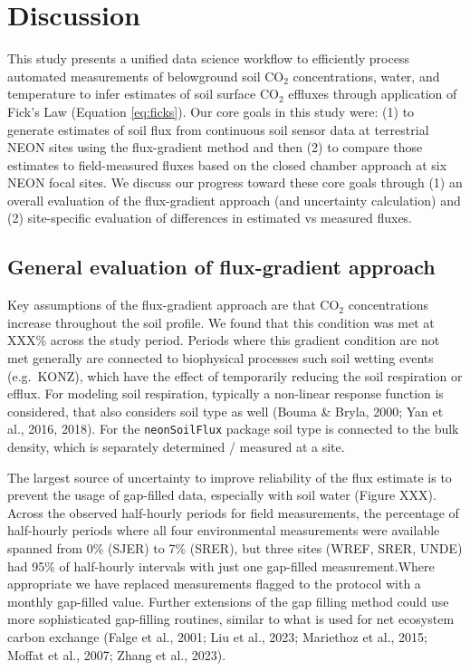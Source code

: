 \documentclass[
  letterpaper,
  DIV=11,
  numbers=noendperiod]{scrartcl}
\begin{document}
\section{Discussion}\label{sec-discussion}

This study presents a unified data science workflow to efficiently
process automated measurements of belowground soil CO\(_{2}\)
concentrations, water, and temperature to infer estimates of soil
surface CO\(_{2}\) effluxes through application of Fick's Law (Equation
\ref{eq:ficks}). Our core goals in this study were: (1) to generate
estimates of soil flux from continuous soil sensor data at terrestrial
NEON sites using the flux-gradient method and then (2) to compare those
estimates to field-measured fluxes based on the closed chamber approach
at six NEON focal sites. We discuss our progress toward these core goals
through (1) an overall evaluation of the flux-gradient approach (and
uncertainty calculation) and (2) site-specific evaluation of differences
in estimated vs measured fluxes.

\subsection{General evaluation of flux-gradient
approach}\label{general-evaluation-of-flux-gradient-approach}

Key assumptions of the flux-gradient approach are that CO\(_{2}\)
concentrations increase throughout the soil profile. We found that this
condition was met at XXX\% across the study period. Periods where this
gradient condition are not met generally are connected to biophysical
processes such soil wetting events (e.g.~KONZ), which have the effect of
temporarily reducing the soil respiration or efflux. For modeling soil
respiration, typically a non-linear response function is considered,
that also considers soil type as well (Bouma \& Bryla, 2000; Yan et al.,
2016, 2018). For the \texttt{neonSoilFlux} package soil type is
connected to the bulk density, which is separately determined / measured
at a site.

The largest source of uncertainty to improve reliability of the flux
estimate is to prevent the usage of gap-filled data, especially with
soil water (Figure XXX). Across the observed half-hourly periods for
field measurements, the percentage of half-hourly periods where all four
environmental measurements were available spanned from 0\% (SJER) to 7\%
(SRER), but three sites (WREF, SRER, UNDE) had 95\% of half-hourly
intervals with just one gap-filled measurement.Where appropriate we have
replaced measurements flagged to the protocol with a monthly gap-filled
value. Further extensions of the gap filling method could use more
sophisticated gap-filling routines, similar to what is used for net
ecosystem carbon exchange (Falge et al., 2001; Liu et al., 2023;
Mariethoz et al., 2015; Moffat et al., 2007; Zhang et al., 2023).
\end{document}
